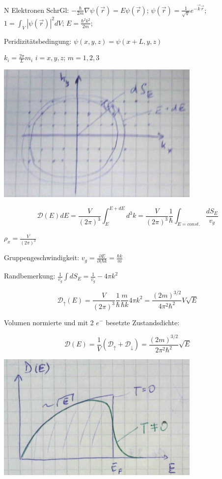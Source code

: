 N Elektronen
SchrGl: \(-\frac{\hbar}{2m} \nabla \psi(\vec r) = E \psi(\vec r)\); \(\psi(\vec r) = \frac{1}{\sqrt{V}} e^{-\vec k\vec r}\); \(1=\int_V|\psi(\vec r)|^2dV\); \(E=\frac{\hbar^2k^2}{2m}\);

Peridizitätsbedingung:  \(\psi(x,y,z) = \psi(x+L,y,z)\)

\(k_i=\frac{2\pi}{L}m_i\) \(i=x,y,z\); \(m=1,2,3\)

\includegraphics[width=0.75\textwidth]{kap06_24.png}

\[\mathcal D(E) dE = \frac{V}{(2\pi)^3}\int^{E+dE}_E d^3 k = \frac{V}{(2\pi)^3} \frac{1}{\hbar} \int_{E=const.} \frac{dS_E}{v_g}\]

\(\rho_x = \frac{V}{(2\pi)^3}\)

Gruppengeschwindigkeit: \(v_g = \frac{\partial E}{\partial(\hbar k} = \frac{\hbar k}{m}\)

Randbemerkung: \(\frac{1}{v_g}\int dS_E = \frac{1}{v_g}-4\pi k^2\)

\[\mathcal D_\uparrow(E) = \frac{V}{(2\pi)^3}\frac{1}{\hbar} \frac{m}{\hbar k}4\pi k^2 = \frac{(2m)^{3/2}}{4\pi^2\hbar^2} V\sqrt{E}\]

Volumen normierte und mit 2 \(e^-\) besetzte Zustandsdichte:

\[ \mathcal D(E) = \frac{1}{V} (\mathcal D_\uparrow + \mathcal D_\downarrow) = \frac{(2m)^{3/2}}{2\pi^2\hbar^2}\sqrt{E}\]

\includegraphics[width=0.75\textwidth]{kap06_25.png}

